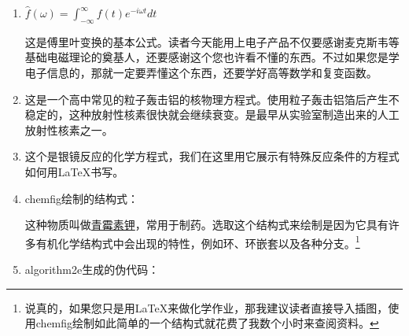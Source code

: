 \begin{enumerate}

\item $ \hat{f}(\omega)=\int^{\infty}_{-\infty}f(t)e^{-i\omega t}dt $

这是傅里叶变换的基本公式。读者今天能用上电子产品不仅要感谢麦克斯韦等基础电磁理论的奠基人，还要感谢这个您也许看不懂的东西。不过如果您是学电子信息的，那就一定要弄懂这个东西，还要学好高等数学和复变函数。

\item {}

这是一个高中常见的\textalpha 粒子轰击铝的核物理方程式。使用\textalpha 粒子轰击铝箔后产生不稳定的，这种放射性核素很快就会继续衰变。是最早从实验室制造出来的人工放射性核素之一。

\item {}

这个是银镜反应的化学方程式，我们在这里用它展示有特殊反应条件的方程式如何用\LaTeX 书写。

\item chemfig绘制的结构式：

 

这种物质叫做\href{https://www.chem960.com/cas/113984/}{青霉素钾}，常用于制药。选取这个结构式来绘制是因为它具有许多有机化学结构式中会出现的特性，例如环、环嵌套以及各种分支。\footnote{说真的，如果您只是用\LaTeX 来做化学作业，那我建议读者直接导入插图，使用chemfig绘制如此简单的一个结构式就花费了我数个小时来查阅资料。}

\item algorithm2e生成的伪代码：

\begin{algorithm}[H]
	
	
	
	\SetAlgoNoLine
	
\end{algorithm}


\end{enumerate}
